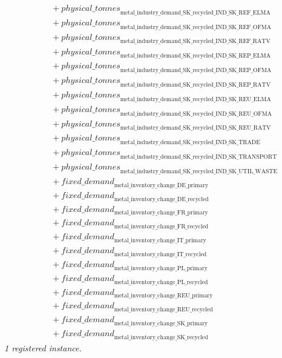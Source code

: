 \documentclass[11pt]{article}
\begin{document}
\begin{align*}
&\quad {}+ {physical\_tonnes}_{\text{metal\_industry\_demand\_SK\_recycled\_IND\_SK\_REF\_ELMA}}\\
&\quad {}+ {physical\_tonnes}_{\text{metal\_industry\_demand\_SK\_recycled\_IND\_SK\_REF\_OFMA}}\\
&\quad {}+ {physical\_tonnes}_{\text{metal\_industry\_demand\_SK\_recycled\_IND\_SK\_REF\_RATV}}\\
&\quad {}+ {physical\_tonnes}_{\text{metal\_industry\_demand\_SK\_recycled\_IND\_SK\_REP\_ELMA}}\\
&\quad {}+ {physical\_tonnes}_{\text{metal\_industry\_demand\_SK\_recycled\_IND\_SK\_REP\_OFMA}}\\
&\quad {}+ {physical\_tonnes}_{\text{metal\_industry\_demand\_SK\_recycled\_IND\_SK\_REP\_RATV}}\\
&\quad {}+ {physical\_tonnes}_{\text{metal\_industry\_demand\_SK\_recycled\_IND\_SK\_REU\_ELMA}}\\
&\quad {}+ {physical\_tonnes}_{\text{metal\_industry\_demand\_SK\_recycled\_IND\_SK\_REU\_OFMA}}\\
&\quad {}+ {physical\_tonnes}_{\text{metal\_industry\_demand\_SK\_recycled\_IND\_SK\_REU\_RATV}}\\
&\quad {}+ {physical\_tonnes}_{\text{metal\_industry\_demand\_SK\_recycled\_IND\_SK\_TRADE}}\\
&\quad {}+ {physical\_tonnes}_{\text{metal\_industry\_demand\_SK\_recycled\_IND\_SK\_TRANSPORT}}\\
&\quad {}+ {physical\_tonnes}_{\text{metal\_industry\_demand\_SK\_recycled\_IND\_SK\_UTIL\_WASTE}}\\
&\quad {}+ {fixed\_demand}_{\text{metal\_inventory\_change\_DE\_primary}}\\
&\quad {}+ {fixed\_demand}_{\text{metal\_inventory\_change\_DE\_recycled}}\\
&\quad {}+ {fixed\_demand}_{\text{metal\_inventory\_change\_FR\_primary}}\\
&\quad {}+ {fixed\_demand}_{\text{metal\_inventory\_change\_FR\_recycled}}\\
&\quad {}+ {fixed\_demand}_{\text{metal\_inventory\_change\_IT\_primary}}\\
&\quad {}+ {fixed\_demand}_{\text{metal\_inventory\_change\_IT\_recycled}}\\
&\quad {}+ {fixed\_demand}_{\text{metal\_inventory\_change\_PL\_primary}}\\
&\quad {}+ {fixed\_demand}_{\text{metal\_inventory\_change\_PL\_recycled}}\\
&\quad {}+ {fixed\_demand}_{\text{metal\_inventory\_change\_REU\_primary}}\\
&\quad {}+ {fixed\_demand}_{\text{metal\_inventory\_change\_REU\_recycled}}\\
&\quad {}+ {fixed\_demand}_{\text{metal\_inventory\_change\_SK\_primary}}\\
&\quad {}+ {fixed\_demand}_{\text{metal\_inventory\_change\_SK\_recycled}}
\end{align*}
\noindent\emph{1 registered instance.}\par
\end{document}
